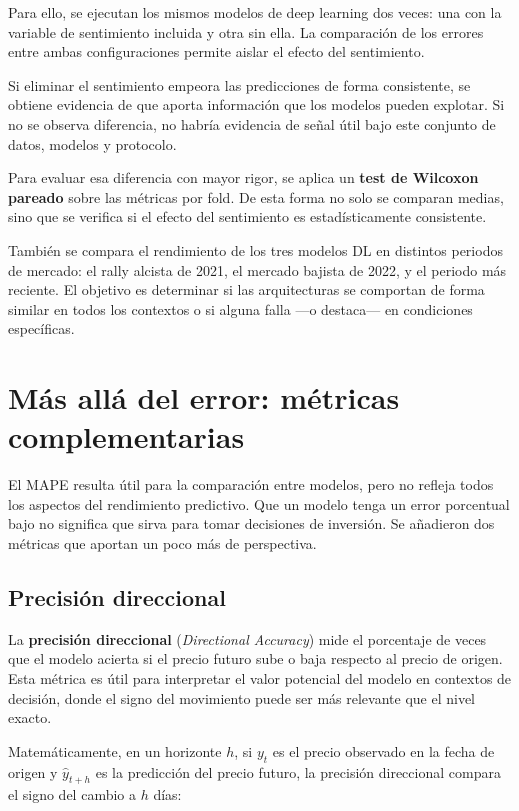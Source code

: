 Para ello, se ejecutan los mismos modelos de deep learning dos veces: una con la variable de sentimiento incluida y otra sin ella. La comparación de los errores entre ambas configuraciones permite aislar el efecto del sentimiento.

Si eliminar el sentimiento empeora las predicciones de forma consistente, se obtiene evidencia de que aporta información que los modelos pueden explotar. Si no se observa diferencia, no habría evidencia de señal útil bajo este conjunto de datos, modelos y protocolo.

Para evaluar esa diferencia con mayor rigor, se aplica un \textbf{test de Wilcoxon pareado} sobre las métricas por fold. De esta forma no solo se comparan medias, sino que se verifica si el efecto del sentimiento es estadísticamente consistente.

También se compara el rendimiento de los tres modelos DL en distintos periodos de mercado: el rally alcista de 2021, el mercado bajista de 2022, y el periodo más reciente. El objetivo es determinar si las arquitecturas se comportan de forma similar en todos los contextos o si alguna falla ---o destaca--- en condiciones específicas.

\section{Más allá del error: métricas complementarias}

El MAPE resulta útil para la comparación entre modelos, pero no refleja todos los aspectos del rendimiento predictivo. Que un modelo tenga un error porcentual bajo no significa que sirva para tomar decisiones de inversión. Se añadieron dos métricas que aportan un poco más de perspectiva.

\subsection{Precisión direccional}

La \textbf{precisión direccional} (\textit{Directional Accuracy}) mide el porcentaje de veces que el modelo acierta si el precio futuro sube o baja respecto al precio de origen. Esta métrica es útil para interpretar el valor potencial del modelo en contextos de decisión, donde el signo del movimiento puede ser más relevante que el nivel exacto.

Matemáticamente, en un horizonte $h$, si $y_t$ es el precio observado en la fecha de origen y $\hat{y}_{t+h}$ es la predicción del precio futuro, la precisión direccional compara el signo del cambio a $h$ días:

